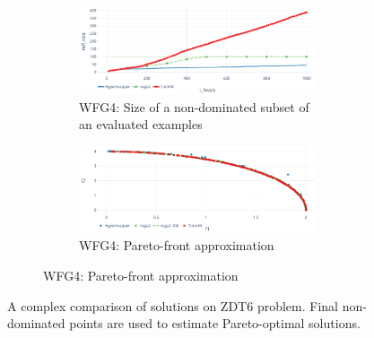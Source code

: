 \begin{figure}
        \begin{subfigure}{\textwidth}
            \begin{subfigure}{0.5\textwidth}
                \includegraphics[width=\textwidth]{content/images/wfg4_ndf}
                \caption{WFG4: Size of a non-dominated subset of an evaluated examples}
                \label{fig:wfg4_ndf}
            \end{subfigure} 
            \begin{subfigure}{0.5\textwidth}
                \includegraphics[width=\textwidth]{content/images/wfg4_front}
                \caption{WFG4: Pareto-front approximation}
                \label{fig:wfg4_front}
            \end{subfigure}
        \end{subfigure} 
        
 

        \caption[Comparison of solutions on ZDT6 problem]{A complex comparison of solutions on ZDT6 problem. Final non-dominated points are used to estimate Pareto-optimal solutions.}
        \label{fig:wfg_14}    
    \end{figure}





